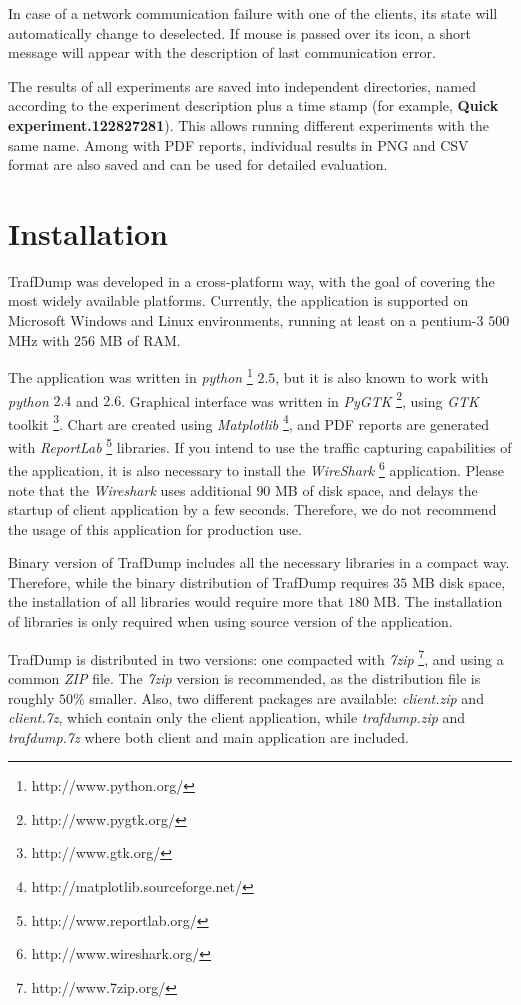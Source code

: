 \documentclass[12pt]{report}
\begin{document}
In case of a network communication failure with one of the clients, its
state will automatically change to deselected. If mouse is passed over its
icon, a short message will appear with the description of last communication error.

The results of all experiments are saved into independent directories, named
according to the experiment description plus a time stamp (for example,
\textbf{Quick experiment.122827281}). This allows running different
experiments with the same name. Among with PDF reports, individual results
in PNG and CSV format are also saved and can be used for detailed
evaluation.

\chapter{Installation}

TrafDump was developed in a cross-platform way, with the goal of covering
the most widely available platforms. Currently, the application is supported
on Microsoft Windows and Linux environments, running at least on a pentium-3
$500$ MHz with $256$ MB of RAM.

The application was written in \emph{python}
\footnote{http://www.python.org/} $2.5$, but it is also known to work with
\emph{python} $2.4$ and $2.6$. Graphical interface was written in
\emph{PyGTK} \footnote{http://www.pygtk.org/}, using \emph{GTK} toolkit
\footnote{http://www.gtk.org/}. Chart are created using \emph{Matplotlib}
\footnote{http://matplotlib.sourceforge.net/}, and PDF reports are generated
with \emph{ReportLab} \footnote{http://www.reportlab.org/} libraries. If you
intend to use the traffic capturing capabilities of the application, it is
also necessary to install the \emph{WireShark}
\footnote{http://www.wireshark.org/} application. Please note that the
\emph{Wireshark} uses additional $90$ MB of disk space, and delays the
startup of client application by a few seconds. Therefore, we do not
recommend the usage of this application for production use.

Binary version of TrafDump includes all the necessary libraries in a compact
way. Therefore, while the binary distribution of TrafDump requires $35$ MB
disk space, the installation of all libraries would require more that $180$
MB. The installation of libraries is only required when using source version
of the application.

TrafDump is distributed in two versions: one compacted with \emph{7zip}
\footnote{http://www.7zip.org/}, and using a common \emph{ZIP} file. The
\emph{7zip} version is recommended, as the distribution file is roughly $50\%$
smaller. Also, two different packages are available: \emph{client.zip} and
\emph{client.7z}, which contain only the client application, while
\emph{trafdump.zip} and \emph{trafdump.7z} where both client and main
application are included.
\end{document}
